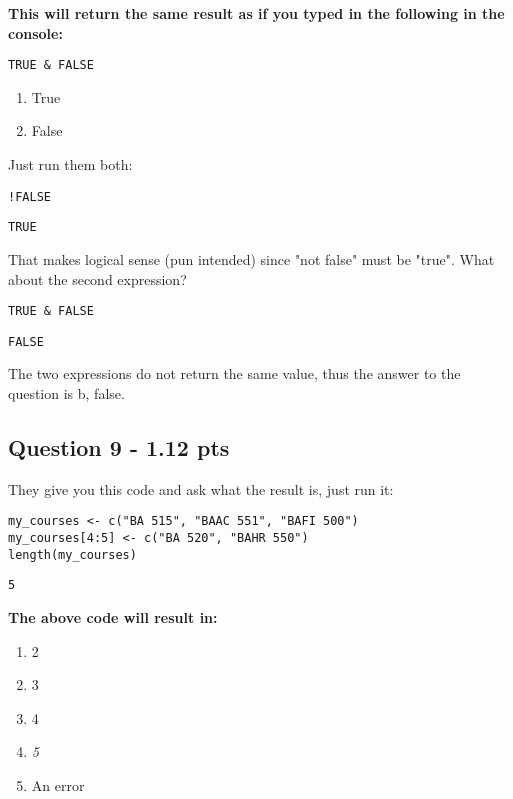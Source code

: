 \documentclass[11pt]{article}
\begin{document}
\textbf{This will return the same result as if you typed in the following in the console:}

\texttt{TRUE \& FALSE}

\begin{enumerate}
\item True
\item False
\end{enumerate}


Just run them both:
\begin{verbatim}
!FALSE
\end{verbatim}

\begin{verbatim}
TRUE
\end{verbatim}


That makes logical sense (pun intended) since "not false" must be "true".  What about the second expression?

\begin{verbatim}
TRUE & FALSE
\end{verbatim}

\begin{verbatim}
FALSE
\end{verbatim}


The two expressions do not return the same value, thus the answer to the question is b, false.
\subsection*{Question 9 - 1.12 pts}
\label{sec:org9740d7a}
They give you this code and ask what the result is, just run it:

\begin{verbatim}
my_courses <- c("BA 515", "BAAC 551", "BAFI 500")
my_courses[4:5] <- c("BA 520", "BAHR 550")
length(my_courses)
\end{verbatim}

\begin{verbatim}
5
\end{verbatim}


\textbf{The above code will result in:}
\begin{enumerate}
\item 2
\item 3
\item 4
\item \emph{5}
\item An error
\end{enumerate}
\end{document}
